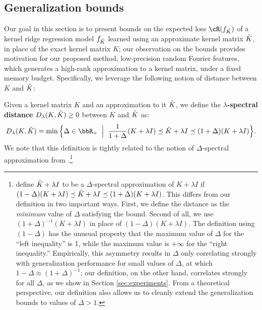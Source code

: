 \subsection{Generalization bounds}
\label{sec:genbound}
Our goal in this section is to present bounds on the expected loss $\cR(f_{\tK})$ of a kernel ridge regression model $f_{\tilde{K}}$ learned using an approximate kernel matrix $\tilde{K}$, in place of the exact kernel matrix $K$; our observation on the bounds provides motivation for our proposed method, low-precision random Fourier features, which generates a high-rank approximation to a kernel matrix, under a fixed memory budget.
 Specifically, we leverage the following notion of distance between $K$ and $\tilde{K}$:

\begin{definition}
	Given a kernel matrix $K$ and an approximation to it $\tilde{K}$, we define the \textbf{$\lambda$-spectral distance} $D_{\lambda}(K,\tilde{K})\geq 0$ between $K$ and $\tilde{K}$ as:
	$$D_{\lambda}(K,\tK) = \min \Big\{\Delta \in \RR_{+} \;\;\Big|\;\; \frac{1}{1+\Delta}(K+\lambda I) \preceq \tK + \lambda I \preceq (1+\Delta)(K+\lambda I)\Big\}.$$
	We note that this definition is tightly related to the notion of $\Delta$-spectral approximation from \citet{avron17}.\footnote{\citet{avron17} define $\tilde{K}+\lambda I$ to be a $\Delta$-spectral approximation of $K+\lambda I$ if $(1-\Delta)(K+\lambda I) \preceq \tilde{K} + \lambda I \preceq (1+\Delta)(K+\lambda I)$. This differs from our definition in two important ways. First, we define the distance as the \textit{minimum} value of $\Delta$ satisfying the bound.  Second of all, we use $(1+\Delta)^{-1}(K+\lambda I)$ in place of $(1-\Delta)(K+\lambda I)$. The definition using $(1-\Delta)$ has the unusual property that the maximum value of $\Delta$ for the ``left inequality'' is 1, while the maximum value is $+\infty$ for the ``right inequality.'' Empirically, this asymmetry results in $\Delta$ only correlating strongly with generalization performance for small values of $\Delta$, at which $1-\Delta\approx (1+\Delta)^{-1}$; our definition, on the other hand, correlates strongly for all $\Delta$, as we show in Section \ref{sec:experiments}.  From a theoretical perspective, our definition also allows us to cleanly extend the generalization bounds to values of $\Delta > 1$.}
\end{definition}

